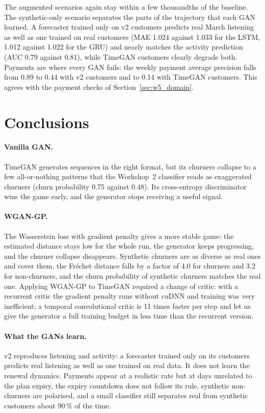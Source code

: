 \documentclass{article}
\begin{document}
The augmented scenarios again stay within a few thousandths of the baseline. The synthetic-only scenario separates the parts of the trajectory that each GAN learned. A forecaster trained only on v2 customers predicts real March listening as well as one trained on real customers (MAE 1.024 against 1.033 for the LSTM, 1.012 against 1.022 for the GRU) and nearly matches the activity prediction (AUC 0.79 against 0.81), while TimeGAN customers clearly degrade both. Payments are where every GAN fails: the weekly payment average precision falls from 0.89 to 0.44 with v2 customers and to 0.14 with TimeGAN customers. This agrees with the payment checks of Section~\ref{sec:w5_domain}.

\section{Conclusions}

\paragraph{Vanilla GAN.} TimeGAN generates sequences in the right format, but its churners collapse to a few all-or-nothing patterns that the Workshop~2 classifier reads as exaggerated churners (churn probability 0.75 against 0.48). Its cross-entropy discriminator wins the game early, and the generator stops receiving a useful signal.

\paragraph{WGAN-GP.} The Wasserstein loss with gradient penalty gives a more stable game: the estimated distance stays low for the whole run, the generator keeps progressing, and the churner collapse disappears. Synthetic churners are as diverse as real ones and cover them, the Fréchet distance falls by a factor of 4.0 for churners and 3.2 for non-churners, and the churn probability of synthetic churners matches the real one. Applying WGAN-GP to TimeGAN required a change of critic: with a recurrent critic the gradient penalty runs without cuDNN and training was very inefficient; a temporal convolutional critic is 11 times faster per step and let us give the generator a full training budget in less time than the recurrent version.

\paragraph{What the GANs learn.} v2 reproduces listening and activity: a forecaster trained only on its customers predicts real listening as well as one trained on real data. It does not learn the renewal dynamics. Payments appear at a realistic rate but at days unrelated to the plan expiry, the expiry countdown does not follow its rule, synthetic non-churners are polarised, and a small classifier still separates real from synthetic customers about 90\,\% of the time.
\end{document}
